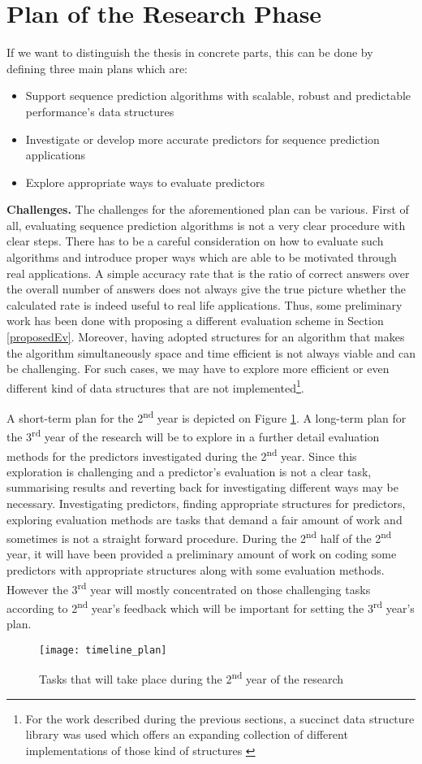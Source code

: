   \newpage
 
 \section{Plan of the Research Phase}{\label{plan}}
If we want to distinguish the thesis in concrete parts, this can be done by defining three main plans which are:
\begin{itemize}
   \item  Support sequence prediction algorithms with scalable, robust and predictable performance's data structures
   \item Investigate or develop more accurate predictors for sequence prediction applications
   \item Explore appropriate ways to evaluate predictors
 \end{itemize}
\par\textbf{Challenges.} The challenges for the aforementioned plan can be various. First of all, evaluating sequence prediction algorithms is not a very clear procedure with clear steps. There has to be a careful consideration on how to evaluate such algorithms and introduce proper ways which are able to be motivated through real applications. A simple accuracy rate that is the ratio of correct answers over the overall number of answers does not always give the true picture whether the calculated rate is indeed useful to real life applications. Thus, some preliminary work has been done with proposing a different evaluation scheme in Section \ref{proposedEv}. Moreover, having adopted structures for an algorithm that makes the algorithm simultaneously space and time efficient is not always viable and can be challenging. For such cases, we may have to explore more efficient or even different kind of data structures that are not implemented\footnote{For the work described during the previous sections, a succinct data structure library was used which offers an expanding collection of different implementations of those kind of structures \cite{gog_2015}}.

\par A short-term plan for the 2\textsuperscript{nd} year is depicted on Figure \ref{fig:timeplan}. A long-term plan for the 3\textsuperscript{rd} year of the research will be to explore in a further detail evaluation methods for the predictors investigated during the 2\textsuperscript{nd} year. Since this exploration is challenging and a predictor's evaluation is not a clear task, summarising results and reverting back for investigating different ways may be necessary. Investigating predictors, finding appropriate structures for predictors, exploring evaluation methods are tasks that demand a fair amount of work and sometimes is not a straight forward procedure. During the 2\textsuperscript{nd} half of the 2\textsuperscript{nd} year, it will have been provided a preliminary amount of work on coding some predictors with appropriate structures along with some evaluation methods. However the 3\textsuperscript{rd} year will mostly concentrated on those challenging tasks according to 2\textsuperscript{nd} year's feedback which will be important for setting the 3\textsuperscript{rd} year's plan.


\begin{figure}[h]
    \centering
    \texttt{[image: timeline\_plan]}
    \caption{Tasks that will take place during the 2\textsuperscript{nd} year of the research}
    \label{fig:timeplan}
\end{figure}


 \newpage
